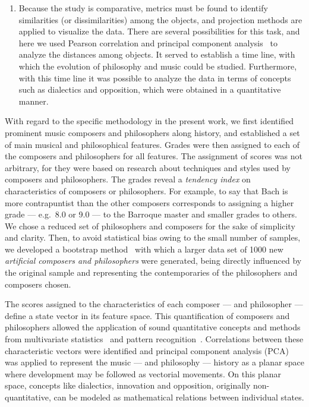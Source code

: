 \documentclass[
 aip,
 jmp,
 amsmath,amssymb,
 reprint,
]{revtex4-1}
\begin{document}
\begin{enumerate}
  \item{Because the study is comparative, metrics must be found to
    identify similarities (or dissimilarities) among the objects, and
    projection methods are applied to visualize the data. There are
    several possibilities for this task, and here we used Pearson
    correlation and principal component analysis~\cite{Costa} to
    analyze the distances among objects. It served to establish a time
    line, with which the evolution of philosophy and music could be
    studied. Furthermore, with this time line it was possible to
    analyze the data in terms of concepts such as dialectics and
    opposition, which were obtained in a quantitative manner.}
\end{enumerate}

With regard to the specific methodology in the present work, we first
identified prominent music composers and philosophers along history,
and established a set of main musical and philosophical
features. Grades were then assigned to each of the composers and
philosophers for all features. The assignment of scores was not
arbitrary, for they were based on research about techniques and styles
used by composers and philosophers. The grades reveal a \emph{tendency
  index} on characteristics of composers or philosophers. For example,
to say that Bach is more contrapuntist than the other composers
corresponds to assigning a higher grade --- e.g.\ 8.0 or 9.0 --- to
the Barroque master and smaller grades to others. We chose a reduced
set of philosophers and composers for the sake of simplicity and
clarity. Then, to avoid statistical bias owing to the small number of
samples, we developed a bootstrap method~\cite{Varian} with which a
larger data set of 1000 new \emph{artificial composers and
  philosophers} were generated, being directly influenced by the
original sample and representing the contemporaries of the
philosophers and composers chosen.

The scores assigned to the characteristics of each composer --- and
philosopher --- define a state vector in its feature space. This
quantification of composers and philosophers allowed the application
of sound quantitative concepts and methods from multivariate
statistics~\cite{Papoulis, Wichern, Therrien} and pattern
recognition~\cite{Duda, Costa}. Correlations between these
characteristic vectors were identified and principal component
analysis (PCA)~\cite{Costa} was applied to represent the music --- and
philosophy --- history as a planar space where development may be
followed as vectorial movements. On this planar space, concepts like
dialectics, innovation and opposition, originally non-quantitative,
can be modeled as mathematical relations between individual states.
\end{document}
